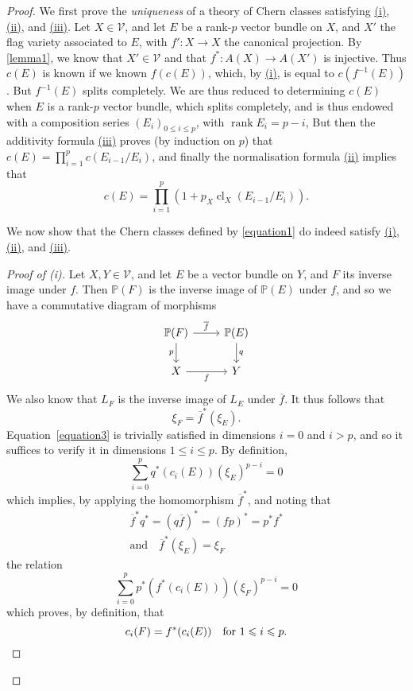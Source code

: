 \documentclass{article}
\theoremstyle{plain}
\theoremstyle{definition}
\newcommand{\cat}[1]{{\mathcal{#1}}}
\renewcommand{\leq}{\leqslant}
\DeclareMathOperator{\rank}{rank}
\DeclareMathOperator{\cl}{cl}
\newcommand{\oldpage}[1]{\marginpar{\footnotesize$\Big\vert$ \textit{p.~#1}}}
\begin{document}
\begin{proof}
\oldpage{145}
  We first prove the \emph{uniqueness} of a theory of Chern classes satisfying \hyperref[theorem1i]{\rm{(i)}}, \hyperref[theorem1ii]{\rm{(ii)}}, and \hyperref[theorem1iii]{\rm{(iii)}}.
  Let $X\in\cat{V}$, and let $E$ be a rank-$p$ vector bundle on $X$, and $X'$ the flag variety associated to $E$, with $f'\colon X\to X$ the canonical projection.
  By \cref{lemma1}, we know that $X'\in\cat{V}$ and that $f^*\colon A(X)\to A(X')$ is injective.
  Thus $c(E)$ is known if we known $f(c(E))$, which, by \hyperref[theorem1i]{\rm{(i)}}, is equal to $c(f^{-1}(E))$.
  But $f^{-1}(E)$ splits completely.
  We are thus reduced to determining $c(E)$ when $E$ is a rank-$p$ vector bundle, which splits completely, and is thus endowed with a composition series $(E_i)_{0\leq i\leq p}$, with $\rank E_i=p-i$,
  But then the additivity formula \hyperref[theorem1iii]{\rm{(iii)}} proves (by induction on $p$) that $c(E)=\prod_{i=1}^p c(E_{i-1}/E_i)$, and finally the normalisation formula \hyperref[theorem1ii]{\rm{(ii)}} implies that
  \[
  \label{equation6}
    c(E) = \prod_{i=1}^p (1+p_X\cl_X(E_{i-1}/E_i)).
  \tag{6}
  \]

  We now show that the Chern classes defined by \cref{equation1} do indeed satisfy \hyperref[theorem1i]{\rm{(i)}}, \hyperref[theorem1ii]{\rm{(ii)}}, and \hyperref[theorem1iii]{\rm{(iii)}}.

  \begin{proof}[Proof of \rm{(i)}]
    Let $X,Y\in\cat{V}$, and let $E$ be a vector bundle on $Y$, and $F$ its inverse image under $f$.
    Then $\mathbb{P}(F)$ is the inverse image of $\mathbb{P}(E)$ under $f$, and so we have a commutative diagram of morphisms
    \[
      \begin{tikzcd}
        \mathbb{P}(F) \rar["\overline{f}"] \dar[swap,"p"]
        & \mathbb{P}(E) \dar["q"]
      \\X \rar[swap,"f"]
        & Y
      \end{tikzcd}
    \]
    We also know that $L_F$ is the inverse image of $L_E$ under $\overline{f}$.
    It thus follows that
    \[
      \xi_F = \overline{f}^*(\xi_E).
    \]
    Equation~\cref{equation3} is trivially satisfied in dimensions $i=0$ and $i>p$, and so it suffices to verify it in dimensions $1\leq i\leq p$.
    By definition,
    \[
      \sum_{i=0}^p q^*(c_i(E))(\xi_E)^{p-i} = 0
    \]
    which implies, by applying the homomorphism $\overline{f}^*$, and noting that
    \[
      \begin{gathered}
        \overline{f}^*q^* = (q\overline{f})^* = (fp)^* = p^*f^*
      \\\text{and}\quad\overline{f}^*(\xi_E) = \xi_F
      \end{gathered}
    \]
    the relation
    \[
      \sum_{i=0}^p p^*(f^*(c_i(E)))(\xi_F)^{p-i} = 0
    \]
\oldpage{146}
    which proves, by definition, that
    \[
      c_i(F) = f^*(c_i(E))
      \quad\mbox{for $1\leq i\leq p$.}\qedhere
    \]
  \end{proof}


\end{proof}
\end{document}
